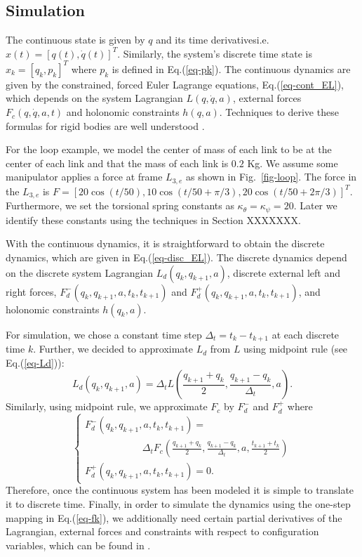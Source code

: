 \documentclass[letterpaper, 10pt, conference]{ieeeconf}
\begin{document}
\subsection{Simulation}
The continuous state is given by $q$ and its time derivatives\textemdash i.e. $x(t) = [q(t),\dot{q}(t)]^T$.  Similarly, the system's discrete time state is $x_k = [q_k,p_k]^T$ where $p_k$ is defined in Eq.(\ref{eq-pk}).   The continuous dynamics are given by the constrained, forced Euler Lagrange equations, Eq.(\ref{eq-cont_EL}), which depends on the system Lagrangian $L(q,\dot{q},a)$, external forces $F_c(q,\dot{q},a,t)$ and holonomic constraints $h(q,a)$. Techniques to derive these formulas for rigid bodies are well understood \cite{murray_li_sastry}.  

For the loop example, we model the center of mass of each link to be at the center of each link and that the mass of each link is $0.2$ Kg.  We assume some manipulator applies a force at frame $L_{3,e}$ as shown in Fig.~\ref{fig-loop}.  The force in the $L_{3,e}$ is $F = [20 \cos(t/50), 10 \cos(t/50 + \pi/3), 20 \cos(t/50 + 2\pi/3)]^T$.  Furthermore, we set the torsional spring constants as $\kappa_\theta = \kappa_\psi = 20$.  Later we identify these constants using the techniques in Section XXXXXXX.  

With the continuous dynamics, it is straightforward to obtain the discrete dynamics, which are given in Eq.(\ref{eq-disc_EL}).  The discrete dynamics depend on the discrete system Lagrangian $L_d(q_{k},q_{k+1},a)$, discrete external left and right forces, $F_d^-(q_{k},q_{k+1},a,t_k,t_{k+1})$ and $F_d^+(q_{k},q_{k+1},a,t_k,t_{k+1})$, and holonomic constraints $h(q_k,a)$.  

For simulation, we chose a constant time step $\Delta_t = t_k - t_{k+1}$ at each discrete time $k$.  Further, we decided to approximate $L_d$ from $L$ using midpoint rule (see Eq.(\ref{eq-Ld})):
\begin{equation}
L_d(q_k,q_{k+1},a) = \Delta_t L(\frac{q_{k+1}+q_k}{2},\frac{q_{k+1}-q_k}{\Delta_t},a).
\label{eq-Ld}
\end{equation}
Similarly, using midpoint rule, we approximate $F_c$ by $F_d^-$ and $F_d^+$ where
\begin{equation}
\left\{
\begin{array}{l}
F_d^-(q_k,q_{k+1},a,t_k,t_{k+1}) = \\\hspace{70pt}\Delta_t F_c(\frac{q_{k+1}+q_k}{2},\frac{q_{k+1}-q_k}{\Delta_t},a,\frac{t_{k+1}+t_k}{2})\\
F_d^+(q_k,q_{k+1},a,t_k,t_{k+1}) = 0.
\end{array}
\right.
\label{eq-Fd}
\end{equation}
Therefore, once the continuous system has been modeled it is simple to translate it to discrete time.  Finally, in order to simulate the dynamics using the one-step mapping in Eq.(\ref{eq-fk}), we additionally need certain partial derivatives of the Lagrangian, external forces and constraints with respect to configuration variables, which can be found in \cite{johnson_murphey_scalable}.  
\end{document}
